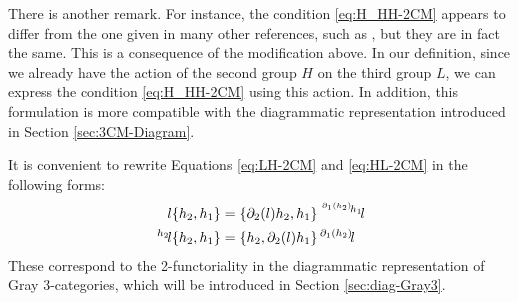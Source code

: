 \documentclass[11pt, reqno]{amsart} %
\newcommand{\act}[1]{\,\sp{#1}\!}
\theoremstyle{definition}
\theoremstyle{remark}
\numberwithin{equation}{section}
\begin{document}
There is another remark. For instance, the condition \eqref{eq:H_HH-2CM} appears to differ from the one given in many other references, such as \cite{Martins:2009evc}, but they are in fact the same. This is a consequence of the modification above. In our definition, since we already have the action of the second group $H$ on the third group $L$, we can express the condition \eqref{eq:H_HH-2CM} using this action. In addition, this formulation is more compatible with the diagrammatic representation introduced in Section \ref{sec:3CM-Diagram}.

It is convenient to rewrite Equations \eqref{eq:LH-2CM} and \eqref{eq:HL-2CM} in the following forms:
\begin{align}
  \label{eq:2CM-2-funct1}
  l\{h_2,h_1\} &= \{\partial_2(l)h_2,h_1\}\act{\act{\partial_1(h_2)}h_1}l \\
  \label{eq:2CM-2-funct2}
  \act{h_2}l\{h_2,h_1\} &= \{h_2,\partial_2(l)h_1\}\act{\partial_1(h_2)}l
\end{align}
These correspond to the 2-functoriality in the diagrammatic representation of Gray 3-categories, which will be introduced in Section \ref{sec:diag-Gray3}.
\end{document}
